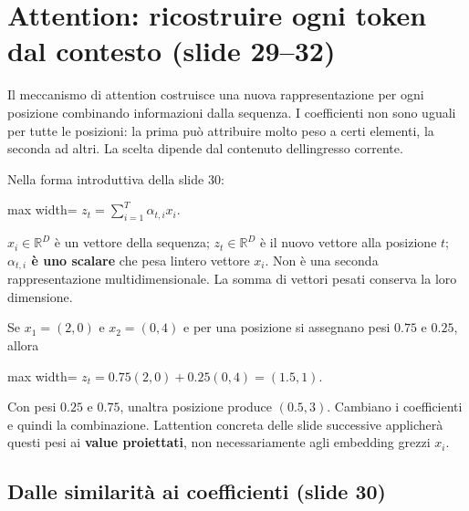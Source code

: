 \documentclass[11pt,a4paper,oneside,openany]{book}
\begin{document}
\section{Attention: ricostruire ogni token dal contesto (slide 29--32)}\label{f04-r487}

Il meccanismo di attention costruisce una nuova rappresentazione per ogni posizione combinando informazioni dalla sequenza. I coefficienti non sono uguali per tutte le posizioni: la prima può attribuire molto peso a certi elementi, la seconda ad altri. La scelta dipende dal contenuto dell\textquotesingle ingresso corrente.

Nella forma introduttiva della slide 30:

\begin{center}
\begin{adjustbox}{max width=\linewidth}
$\displaystyle \boxed{z_t=\sum_{i=1}^{T}\alpha_{t,i}x_i.}$
\end{adjustbox}
\end{center}

\(x_i\in\mathbb R^D\) è un vettore della sequenza; \(z_t\in\mathbb R^D\) è il nuovo vettore alla posizione \(t\); \textbf{\(\alpha_{t,i}\) è uno scalare} che pesa l\textquotesingle intero vettore \(x_i\). Non è una seconda rappresentazione multidimensionale. La somma di vettori pesati conserva la loro dimensione.

Se \(x_1=(2,0)\) e \(x_2=(0,4)\) e per una posizione si assegnano pesi \(0.75\) e \(0.25\), allora

\begin{center}
\begin{adjustbox}{max width=\linewidth}
$\displaystyle z_t=0.75(2,0)+0.25(0,4)=(1.5,1).$
\end{adjustbox}
\end{center}

Con pesi \(0.25\) e \(0.75\), un\textquotesingle altra posizione produce \((0.5,3)\). Cambiano i coefficienti e quindi la combinazione. L\textquotesingle attention concreta delle slide successive applicherà questi pesi ai \textbf{value proiettati}, non necessariamente agli embedding grezzi \(x_i\).

\subsection{Dalle similarità ai coefficienti (slide 30)}\label{f04-r503}
\end{document}
